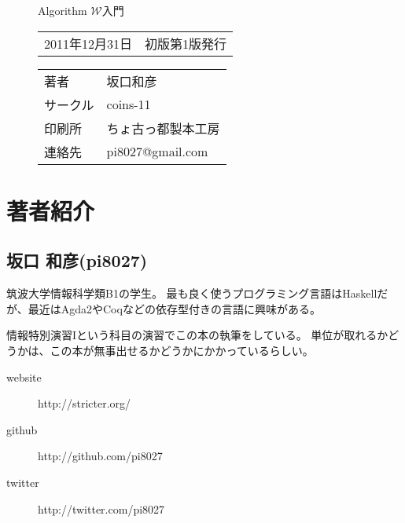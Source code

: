 \thispagestyle{empty}

\begin{figure}[b]

{\LARGE Algorithm $\mathcal W$入門}

\hrulefill

\begin{tabular}{rl}
2011年12月31日 & 初版第1版発行
\end{tabular}

\vspace{1em}

\begin{tabular}{ll}
著者     & 坂口和彦 \\
サークル & coins-11 \\
印刷所   & ちょ古っ都製本工房 \\%
連絡先   & pi8027@gmail.com \\
\end{tabular}

\hrulefill

\end{figure}

\section*{著者紹介}

\subsection*{坂口 和彦(pi8027)}

筑波大学情報科学類B1の学生。
最も良く使うプログラミング言語はHaskellだが、最近はAgda2やCoqなどの依存型付きの言語に興味がある。

情報特別演習Iという科目の演習でこの本の執筆をしている。
単位が取れるかどうかは、この本が無事出せるかどうかにかかっているらしい。

\begin{description}
\item[website] http://stricter.org/
\item[github] http://github.com/pi8027
\item[twitter] http://twitter.com/pi8027
\end{description}

